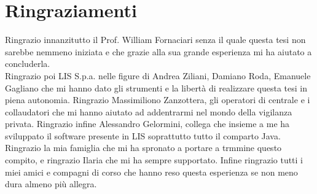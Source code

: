 \chapter*{Ringraziamenti}


Ringrazio innanzitutto il Prof. William Fornaciari senza il quale questa tesi non sarebbe nemmeno iniziata e che grazie alla sua grande esperienza mi ha aiutato a concluderla.\\
Ringrazio poi LIS S.p.a. nelle figure di Andrea Ziliani, Damiano Roda, Emanuele Gagliano che mi hanno dato gli strumenti e la libertà di realizzare questa tesi in piena autonomia. Ringrazio Massimiliono Zanzottera, gli operatori di centrale e i collaudatori che mi hanno aiutato ad addentrarmi nel mondo della vigilanza privata. Ringrazio infine Alessandro Gelormini, collega che insieme a me ha sviluppato il software presente in LIS soprattutto tutto il comparto Java.\\
Ringrazio la mia famiglia che mi ha spronato a portare a trmmine questo compito, e ringrazio Ilaria che mi ha sempre supportato.
Infine ringrazio tutti i miei amici e compagni di corso che hanno reso questa esperienza se non meno dura almeno più allegra.
